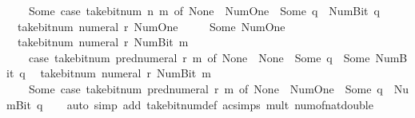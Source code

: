 \begin{isabellebody}
\ \ \ \ Some\ {\isacharparenleft}{\kern0pt}case\ take{\isacharunderscore}{\kern0pt}bit{\isacharunderscore}{\kern0pt}num\ n\ m\ of\ None\ {\isasymRightarrow}\ Num{\isachardot}{\kern0pt}One\ {\isacharbar}{\kern0pt}\ Some\ q\ {\isasymRightarrow}\ Num{\isachardot}{\kern0pt}Bit{}\ q{\isacharparenright}{\kern0pt}{\isacartoucheclose}\isanewline
\ \ {\isacartoucheopen}take{\isacharunderscore}{\kern0pt}bit{\isacharunderscore}{\kern0pt}num\ {\isacharparenleft}{\kern0pt}numeral\ r{\isacharparenright}{\kern0pt}\ Num{\isachardot}{\kern0pt}One\ {\isacharequal}{\kern0pt}\isanewline
\ \ \ \ Some\ Num{\isachardot}{\kern0pt}One{\isacartoucheclose}\isanewline
\ \ {\isacartoucheopen}take{\isacharunderscore}{\kern0pt}bit{\isacharunderscore}{\kern0pt}num\ {\isacharparenleft}{\kern0pt}numeral\ r{\isacharparenright}{\kern0pt}\ {\isacharparenleft}{\kern0pt}Num{\isachardot}{\kern0pt}Bit{}\ m{\isacharparenright}{\kern0pt}\ {\isacharequal}{\kern0pt}\isanewline
\ \ \ \ {\isacharparenleft}{\kern0pt}case\ take{\isacharunderscore}{\kern0pt}bit{\isacharunderscore}{\kern0pt}num\ {\isacharparenleft}{\kern0pt}pred{\isacharunderscore}{\kern0pt}numeral\ r{\isacharparenright}{\kern0pt}\ m\ of\ None\ {\isasymRightarrow}\ None\ {\isacharbar}{\kern0pt}\ Some\ q\ {\isasymRightarrow}\ Some\ {\isacharparenleft}{\kern0pt}Num{\isachardot}{\kern0pt}Bit{}\ q{\isacharparenright}{\kern0pt}{\isacharparenright}{\kern0pt}{\isacartoucheclose}\isanewline
\ \ {\isacartoucheopen}take{\isacharunderscore}{\kern0pt}bit{\isacharunderscore}{\kern0pt}num\ {\isacharparenleft}{\kern0pt}numeral\ r{\isacharparenright}{\kern0pt}\ {\isacharparenleft}{\kern0pt}Num{\isachardot}{\kern0pt}Bit{}\ m{\isacharparenright}{\kern0pt}\ {\isacharequal}{\kern0pt}\isanewline
\ \ \ \ Some\ {\isacharparenleft}{\kern0pt}case\ take{\isacharunderscore}{\kern0pt}bit{\isacharunderscore}{\kern0pt}num\ {\isacharparenleft}{\kern0pt}pred{\isacharunderscore}{\kern0pt}numeral\ r{\isacharparenright}{\kern0pt}\ m\ of\ None\ {\isasymRightarrow}\ Num{\isachardot}{\kern0pt}One\ {\isacharbar}{\kern0pt}\ Some\ q\ {\isasymRightarrow}\ Num{\isachardot}{\kern0pt}Bit{}\ q{\isacharparenright}{\kern0pt}{\isacartoucheclose}\isanewline
%
\isadelimproof
\ \ %
\endisadelimproof
%
\isatagproof
{}\isamarkupfalse%
\ {\isacharparenleft}{\kern0pt}auto\ simp\ add{\isacharcolon}{\kern0pt}\ take{\isacharunderscore}{\kern0pt}bit{\isacharunderscore}{\kern0pt}num{\isacharunderscore}{\kern0pt}def\ ac{\isacharunderscore}{\kern0pt}simps\ mult{\isacharunderscore}{\kern0pt}{}\ num{\isacharunderscore}{\kern0pt}of{\isacharunderscore}{\kern0pt}nat{\isacharunderscore}{\kern0pt}double\isanewline

\end{isabellebody}
